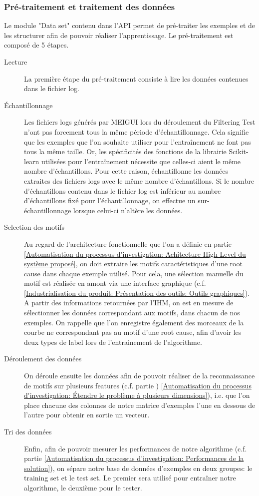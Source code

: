 \subsubsection{Pré-traitement et traitement des données}
\label{Industrialisation du produit: Outils: API: Pré-traitement et traitement des données}
Le module "Data set" contenu dans l'API permet de pré-traiter les exemples et de les structurer afin de pouvoir réaliser l'apprentissage. 
Le pré-traitement est composé de 5 étapes.
\begin{description}
	\item [Lecture] La première étape du pré-traitement consiste à lire les données contenues dans le fichier log. 
	\item [Échantillonnage] Les fichiers logs générés par MEIGUI lors du déroulement du Filtering Test n'ont pas forcement tous la même période d'échantillonnage. Cela signifie que les exemples que l'on souhaite utiliser pour l'entraînement ne font pas tous la même taille. Or, les spécificités des fonctions de la librairie Scikit-learn utilisées pour l'entraînement nécessite que celles-ci aient le même nombre d'échantillons. Pour cette raison, échantillonne les données extraites des fichiers logs avec le même nombre d'échantillons. Si le nombre d'échantillons contenu dans le fichier log est inférieur au nombre d'échantillons fixé pour l'échantillonnage, on effectue un sur-échantillonnage lorsque celui-ci n'altère les données. 
	\item [Selection des motifs] Au regard de l'architecture fonctionnelle que l'on a définie en partie \ref{Automatisation du processus d'investigation: Achitecture High Level du système proposé}, on doit extraire les motifs caractéristiques d'une root cause dans chaque exemple utilisé. Pour cela, une sélection manuelle du motif est réalisée en amont via une interface graphique (c.f. \ref{Industrialisation du produit: Présentation des outils: Outils graphiques}). A partir des informations retournées par l'IHM, on est en mesure de sélectionner les données correspondant aux motifs, dans chacun de nos exemples. On rappelle que l'on enregistre également des morceaux de la courbe ne correspondant pas au motif d'une root cause, afin d'avoir les deux types de label lors de l'entrainement de l'algorithme.
	\item [Déroulement des données] On déroule ensuite les données afin de pouvoir réaliser de la reconnaissance de motifs sur plusieurs features (c.f. partie ) \ref{Automatisation du processus d'investigation: Étendre le problème à plusieurs dimensions}), i.e. que l'on place chacune des colonnes de notre matrice d'exemples l'une en dessous de l'autre pour obtenir en sortie un vecteur. 
	\item [Tri des données] Enfin, afin de pouvoir mesurer les performances de notre algorithme (c.f. partie \ref{Automatisation du processus d'investigation: Performances de la solution}), on sépare notre base de données d'exemples en deux groupes: le training set et le test set. Le premier sera utilisé pour entraîner notre algorithme, le deuxième pour le tester. 
\end{description}

